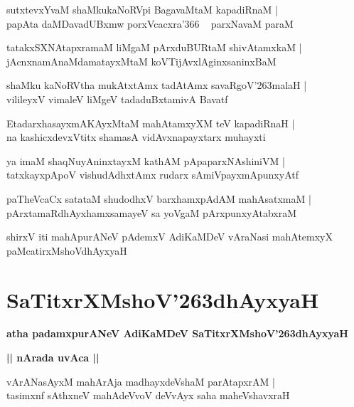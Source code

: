 \documentclass[twoside,12pt,openright]{book}
\def\S{\char'263}
\newcounter{shloka}[chapter]
\def\uvaca#1{\centerline{{\large\textbf{#1}}}}
\begin{document}
\begin{shloka}
sutxtevxYvaM shaMkukaNoRVpi BagavaMtaM kapadiRnaM |\\
papAta daMDavadUBxmw porxVcacxra\char'366 ~ parxNavaM paraM 
\end{shloka}

\begin{shloka}
tatakxSXNAtapxramaM liMgaM pArxduBURtaM shivAtamxkaM |\\
jAcnxnamAnaMdamatayxMtaM koVTijAvxlAginxsaninxBaM 
\end{shloka}

\begin{shloka}
shaMku kaNoRVtha mukAtxtAmx tadAtAmx savaRgoV\S malaH |\\
vilileyxV vimaleV liMgeV tadaduBxtamivA Bavatf 
\end{shloka}

\begin{shloka}
EtadarxhasayxmAKAyxMtaM mahAtamxyXM  teV kapadiRnaH |\\
na kashicxdevxVtitx shamasA vidAvxnapayxtarx muhayxti 
\end{shloka}

\begin{shloka}
ya imaM shaqNuyAninxtayxM kathAM pApaparxNAshiniVM |\\
tatxkayxpApoV vishudAdhxtAmx rudarx sAmiVpayxmApunxyAtf 
\end{shloka}

\begin{shloka}
paTheVcaCx satataM shudodhxV barxhamxpAdAM mahAsatxmaM |\\
pArxtamaRdhAyxhamxsamayeV sa yoVgaM pArxpunxyAtabxraM 
\end{shloka}

\begin{center}
shirxV iti mahApurANeV pAdemxV AdiKaMDeV vAraNasi mahAtemxyX paMcatirxMshoVdhAyxyaH 
\end{center}

\chapter{SaTitxrXMshoV\S dhAyxyaH}

\begin{center}
{\LARGE\bfseries atha padamxpurANeV AdiKaMDeV SaTitxrXMshoV\S dhAyxyaH}
\end{center}

\uvaca{ || nArada uvAca || }

\begin{shloka}
vArANasAyxM mahArAja madhayxdeVshaM parAtapxrAM |\\
tasimxnf sAthxneV mahAdeVvoV deVvAyx saha maheVshavxraH 
\end{shloka}
\end{document}
